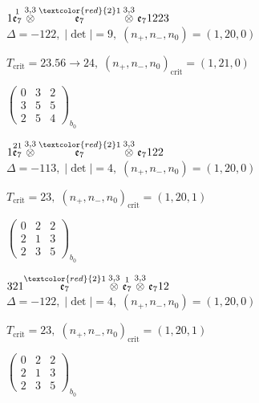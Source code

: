 \documentclass[10pt]{article}
\begin{document}
\smallskip

$1\overset{1}{\mathfrak{e}_7}\overset{3,3}{\otimes}\overset{\textcolor{red}{2}1}{\mathfrak{e}_7}\overset{3,3}{\otimes}\mathfrak{e}_71223$ \quad $\Delta=-122,\; |\det|=9,\; (n_+,n_-,n_0)=(1,20,0)$

\hspace{1em}$T_{\text{crit}}=23.56 \to 24,\; (n_+,n_-,n_0)_{\text{crit}}=(1,21,0)$

\hspace{2em}$\left(\begin{smallmatrix}0 & 3 & 2 \\ 3 & 5 & 5 \\ 2 & 5 & 4\end{smallmatrix}\right)_{\!b_0}$

\smallskip

$1\overset{21}{\mathfrak{e}_7}\overset{3,3}{\otimes}\overset{\textcolor{red}{2}1}{\mathfrak{e}_7}\overset{3,3}{\otimes}\mathfrak{e}_7122$ \quad $\Delta=-113,\; |\det|=4,\; (n_+,n_-,n_0)=(1,20,0)$

\hspace{1em}$T_{\text{crit}}=23,\; (n_+,n_-,n_0)_{\text{crit}}=(1,20,1)$

\hspace{2em}$\left(\begin{smallmatrix}0 & 2 & 2 \\ 2 & 1 & 3 \\ 2 & 3 & 5\end{smallmatrix}\right)_{\!b_0}$

\smallskip

$321\overset{\textcolor{red}{2}1}{\mathfrak{e}_7}\overset{3,3}{\otimes}\overset{1}{\mathfrak{e}_7}\overset{3,3}{\otimes}\mathfrak{e}_712$ \quad $\Delta=-122,\; |\det|=4,\; (n_+,n_-,n_0)=(1,20,0)$

\hspace{1em}$T_{\text{crit}}=23,\; (n_+,n_-,n_0)_{\text{crit}}=(1,20,1)$

\hspace{2em}$\left(\begin{smallmatrix}0 & 2 & 2 \\ 2 & 1 & 3 \\ 2 & 3 & 5\end{smallmatrix}\right)_{\!b_0}$
\end{document}
